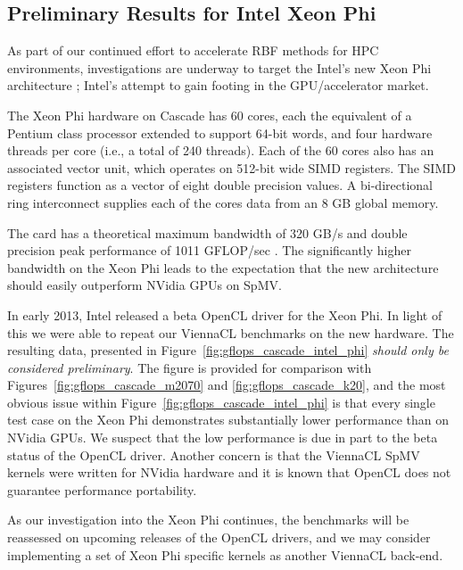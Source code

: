 \documentclass{report}
\begin{document}
\subsection{Preliminary Results for Intel Xeon Phi} 

As part of our continued effort to accelerate RBF methods for HPC environments, investigations are underway to target the Intel's new Xeon Phi architecture \cite{IntelXeonPhi2013}; Intel's attempt to gain footing in the GPU/accelerator market. 

The Xeon Phi hardware on Cascade has 60 cores, each the equivalent of a Pentium class processor extended to support 64-bit words, and four hardware threads per core (i.e., a total of 240 threads). Each of the 60 cores also has an associated vector unit, which operates on 512-bit wide SIMD registers. The SIMD registers function as a vector of eight double precision values. A bi-directional ring interconnect supplies each of the cores data from an 8 GB global memory. 

The card has a theoretical maximum bandwidth of 320 GB/s and double precision peak performance of 1011 GFLOP/sec \cite{IntelXeonPhi2013}. The significantly higher bandwidth on the Xeon Phi leads to the expectation that the new architecture should easily outperform NVidia GPUs on SpMV. 

In early 2013, Intel released a beta OpenCL driver for the Xeon Phi. In light of this we were able to repeat our ViennaCL benchmarks on the new hardware. The resulting data, presented in Figure~\ref{fig:gflops_cascade_intel_phi} \emph{should only be considered preliminary}.  The figure is provided for comparison with Figures~\ref{fig:gflops_cascade_m2070} and \ref{fig:gflops_cascade_k20}, and the most obvious issue within Figure~\ref{fig:gflops_cascade_intel_phi} is that every single test case on the Xeon Phi demonstrates substantially lower performance than on NVidia GPUs. We suspect that the low performance is due in part to the beta status of the OpenCL driver. Another concern is that the ViennaCL SpMV kernels were written for NVidia hardware and it is known that OpenCL does not guarantee performance portability. 

As our investigation into the Xeon Phi continues, the benchmarks will be reassessed on upcoming releases of the OpenCL drivers, and we may consider implementing a set of Xeon Phi specific kernels as another ViennaCL back-end. 
\end{document}
